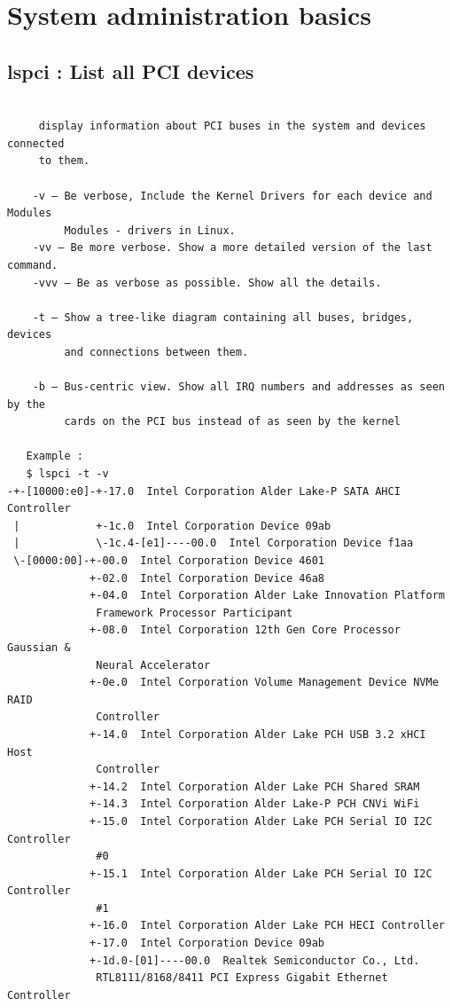 \documentclass[a4paper,12pt]{article}
\begin{document}
\section{System administration basics}

\subsection{lspci : List all PCI devices }
\begin{verbatim}
    
     display information about PCI buses in the system and devices connected 
     to them.
    
    -v – Be verbose, Include the Kernel Drivers for each device and Modules
         Modules - drivers in Linux.
    -vv – Be more verbose. Show a more detailed version of the last command.
    -vvv – Be as verbose as possible. Show all the details.

    -t – Show a tree-like diagram containing all buses, bridges, devices
         and connections between them.

    -b – Bus-centric view. Show all IRQ numbers and addresses as seen by the
         cards on the PCI bus instead of as seen by the kernel

   Example : 
   $ lspci -t -v
-+-[10000:e0]-+-17.0  Intel Corporation Alder Lake-P SATA AHCI Controller
 |            +-1c.0  Intel Corporation Device 09ab
 |            \-1c.4-[e1]----00.0  Intel Corporation Device f1aa
 \-[0000:00]-+-00.0  Intel Corporation Device 4601
             +-02.0  Intel Corporation Device 46a8
             +-04.0  Intel Corporation Alder Lake Innovation Platform
              Framework Processor Participant
             +-08.0  Intel Corporation 12th Gen Core Processor Gaussian &
              Neural Accelerator
             +-0e.0  Intel Corporation Volume Management Device NVMe RAID
              Controller
             +-14.0  Intel Corporation Alder Lake PCH USB 3.2 xHCI Host
              Controller
             +-14.2  Intel Corporation Alder Lake PCH Shared SRAM
             +-14.3  Intel Corporation Alder Lake-P PCH CNVi WiFi
             +-15.0  Intel Corporation Alder Lake PCH Serial IO I2C Controller
              #0
             +-15.1  Intel Corporation Alder Lake PCH Serial IO I2C Controller
              #1
             +-16.0  Intel Corporation Alder Lake PCH HECI Controller
             +-17.0  Intel Corporation Device 09ab
             +-1d.0-[01]----00.0  Realtek Semiconductor Co., Ltd.
              RTL8111/8168/8411 PCI Express Gigabit Ethernet Controller
\end{verbatim}
\end{document}
